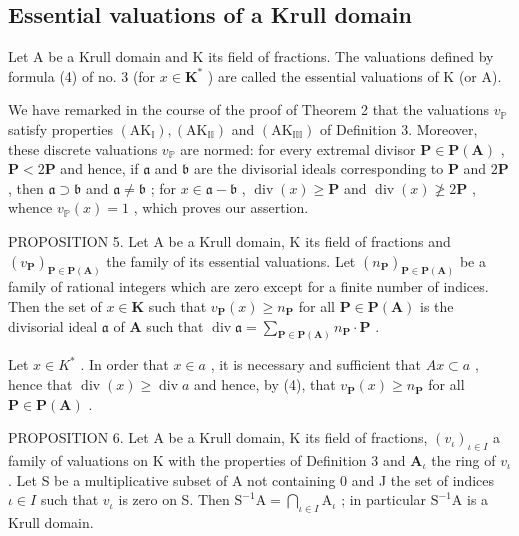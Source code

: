 \subsection{Essential valuations of a Krull domain}

Let A be a Krull domain and K its field of fractions. The valuations defined by formula (4) of no. 3 (for \(x \in \mathbf{K}^*\) ) are called the essential valuations of K (or A).

We have remarked in the course of the proof of Theorem 2 that the valuations \(v_{\mathbb{P}}\) satisfy properties \((\mathrm{AK}_{\mathbb{I}}), (\mathrm{AK}_{\mathbb{II}})\) and \((\mathrm{AK}_{\mathbb{III}})\) of Definition 3. Moreover, these discrete valuations \(v_{\mathbb{P}}\) are normed: for every extremal divisor \(\mathbf{P} \in \mathbf{P}(\mathbf{A})\) , \(\mathbf{P} < 2\mathbf{P}\) and hence, if \(\mathfrak{a}\) and \(\mathfrak{b}\) are the divisorial ideals corresponding to \(\mathbf{P}\) and \(2\mathbf{P}\) , then \(\mathfrak{a} \supset \mathfrak{b}\) and \(\mathfrak{a} \neq \mathfrak{b}\) ; for \(x \in \mathfrak{a} - \mathfrak{b}\) , \(\operatorname{div}(x) \geqslant \mathbf{P}\) and \(\operatorname{div}(x) \not\geqslant 2\mathbf{P}\) , whence \(v_{\mathbb{P}}(x) = 1\) , which proves our assertion.

PROPOSITION 5. Let A be a Krull domain, K its field of fractions and \((v_{\mathbf{P}})_{\mathbf{P} \in \mathbf{P}(\mathbf{A})}\) the family of its essential valuations. Let \((n_{\mathbf{P}})_{\mathbf{P} \in \mathbf{P}(\mathbf{A})}\) be a family of rational integers which are zero except for a finite number of indices. Then the set of \(x \in \mathbf{K}\) such that \(v_{\mathbf{P}}(x) \geqslant n_{\mathbf{P}}\) for all \(\mathbf{P} \in \mathbf{P}(\mathbf{A})\) is the divisorial ideal \(\mathfrak{a}\) of \(\mathbf{A}\) such that \(\operatorname{div} \mathfrak{a} = \sum_{\mathbf{P} \in \mathbf{P}(\mathbf{A})} n_{\mathbf{P}} \cdot \mathbf{P}\) .

Let \(x \in K^*\) . In order that \(x \in a\) , it is necessary and sufficient that \(Ax \subset a\) , hence that \(\operatorname{div}(x) \geqslant \operatorname{div} a\) and hence, by (4), that \(v_{\mathbf{P}}(x) \geqslant n_{\mathbf{P}}\) for all \(\mathbf{P} \in \mathbf{P}(\mathbf{A})\) .

PROPOSITION 6. Let A be a Krull domain, K its field of fractions, \((v_{\iota})_{\iota \in I}\) a family of valuations on K with the properties of Definition 3 and \(\mathbf{A}_{\iota}\) the ring of \(v_{\iota}\) . Let S be a multiplicative subset of A not containing 0 and J the set of indices \(\iota \in I\) such that \(v_{\iota}\) is zero on S. Then \(\mathrm{S}^{-1}\mathrm{A} = \bigcap_{\iota \in I}\mathrm{A}_{\iota}\) ; in particular \(\mathrm{S}^{-1}\mathrm{A}\) is a Krull domain.

